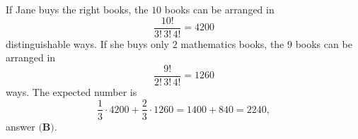 If Jane buys the right books, the $10$ books can be arranged in
\[\dfrac{10!}{3!\,3!\,4!}=4200\]
distinguishable ways. If she buys only $2$ mathematics books, the $9$ books can be arranged in
\[\dfrac{9!}{2!\,3!\,4!}=1260\]
ways. The expected number is
\[\dfrac13\cdot4200+\dfrac23\cdot1260=1400+840=\boxed{2240},\]
answer $\textbf{(B)}$.
